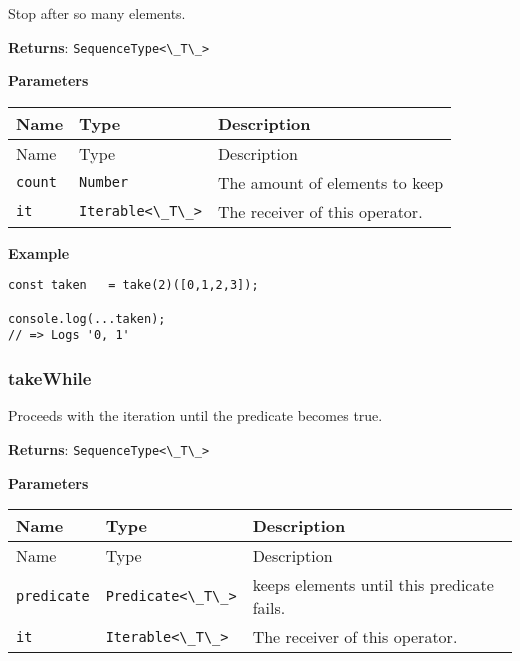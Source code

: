 Stop after so many elements.

\textbf{Returns}: \passthrough{\lstinline!SequenceType<\_T\_>!}

\textbf{Parameters}

\begin{longtable}[]{
  >{\raggedright\arraybackslash}p{}
  >{\raggedright\arraybackslash}p{}
  >{\raggedright\arraybackslash}p{}@{}}

\toprule\noalign{}
Name & Type & Description \\
\midrule\noalign{}
\endfirsthead
\toprule\noalign{}
Name & Type & Description \\
\midrule\noalign{}
\endhead
\bottomrule\noalign{}
\endlastfoot
\passthrough{\lstinline!count!} & \passthrough{\lstinline!Number!} & The
amount of elements to keep \\
\passthrough{\lstinline!it!} & \passthrough{\lstinline!Iterable<\_T\_>!}
& The receiver of this operator. \\
\end{longtable}

\textbf{Example}

\begin{lstlisting}[label=e8ce9038-50f4-4af9-b2fb-5de4fd45e2ca]
const taken   = take(2)([0,1,2,3]);
                                   
console.log(...taken);
// => Logs '0, 1'
\end{lstlisting}

\hypertarget{00fcf74e-3b9e-4957-bbe5-f4ffcb3b6ae5}{%
\subsubsection{takeWhile}\label{00fcf74e-3b9e-4957-bbe5-f4ffcb3b6ae5}}

Proceeds with the iteration until the predicate becomes true.

\textbf{Returns}: \passthrough{\lstinline!SequenceType<\_T\_>!}

\textbf{Parameters}

\begin{longtable}[]{
  >{\raggedright\arraybackslash}p{}
  >{\raggedright\arraybackslash}p{}
  >{\raggedright\arraybackslash}p{}@{}}

\toprule\noalign{}
Name & Type & Description \\
\midrule\noalign{}
\endfirsthead
\toprule\noalign{}
Name & Type & Description \\
\midrule\noalign{}
\endhead
\bottomrule\noalign{}
\endlastfoot
\passthrough{\lstinline!predicate!} &
\passthrough{\lstinline!Predicate<\_T\_>!} & keeps elements until this
predicate fails. \\
\passthrough{\lstinline!it!} & \passthrough{\lstinline!Iterable<\_T\_>!}
& The receiver of this operator. \\
\end{longtable}


